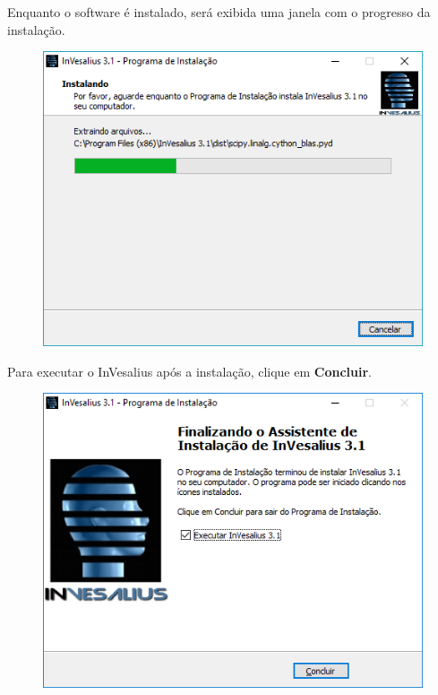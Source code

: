 \hspace{.2cm}

Enquanto o software é instalado, será exibida uma janela com o progresso
da instalação.

\begin{figure}[!htb]
\centering
\includegraphics[scale=0.7]{../user_guide_figures/invesalius_screen/installation_progress_pt.png}
\end{figure}

\newpage

Para executar o InVesalius após a instalação, clique em \textbf{Concluir}.

\begin{figure}[!htb]
\centering
\includegraphics[scale=0.7]{../user_guide_figures/invesalius_screen/installation_finish_pt.png}
\end{figure}

